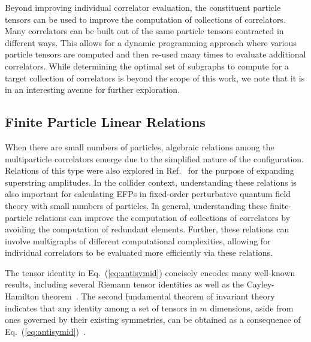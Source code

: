 \documentclass[aps,prd,floatfix,preprintnumbers,twocolumn,groupedaddress,nofootinbib,longbibliography,10pt]{revtex4-1}
\DeclareRobustCommand{\Eq}[1]{Eq.~(\ref{#1})}
\DeclareRobustCommand{\Ref}[1]{Ref.~\cite{#1}}
\begin{document}
Beyond improving individual correlator evaluation, the constituent particle tensors can be used to improve the computation of collections of correlators.
%
Many correlators can be built out of the same particle tensors contracted in different ways.
%
This allows for a dynamic programming approach where various particle tensors are computed and then re-used many times to evaluate additional correlators. 
%
While determining the optimal set of subgraphs to compute for a target collection of correlators is beyond the scope of this work, we note that it is in an interesting avenue for further exploration.


\subsection{Finite Particle Linear Relations}
\label{subsec:vertex_linear}


When there are small numbers of particles, algebraic relations among the multiparticle correlators emerge due to the simplified nature of the configuration.
%
Relations of this type were also explored in \Ref{Boels:2013jua} for the purpose of expanding superstring amplitudes.
%
In the collider context, understanding these relations is also important for calculating EFPs in fixed-order perturbative quantum field theory with small numbers of particles.
%
In general, understanding these finite-particle relations can improve the computation of collections of correlators by avoiding the computation of redundant elements.
%
Further, these relations can involve multigraphs of different computational complexities, allowing for individual correlators to be evaluated more efficiently via these relations.


The tensor identity in \Eq{eq:antisymid} concisely encodes many well-known results, including several Riemann tensor identities as well as the Cayley-Hamilton theorem~\cite{Edgar:2001vv}.
%
The second fundamental theorem of invariant theory indicates that any identity among a set of tensors in $m$ dimensions, aside from ones governed by their existing symmetries, can be obtained as a consequence of \Eq{eq:antisymid}~\cite{sneddon1998identities}.
\end{document}
